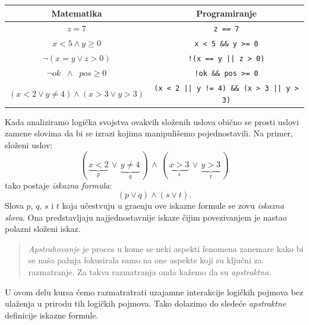 \begin{center}
    \begin{tabular}{@{}cc@{}}
    \hline
    Matematika & Programiranje \\
    \hline
    $z = 7$ & \verb"z == 7" \\
    $x < 5 \land y \ge 0$ & \verb"x < 5 && y >= 0" \\
    $\lnot(x = y \lor z > 0)$ & \verb"!(x == y || z > 0)" \\
    $\lnot\mathit{ok} \;\;\land\;\; \mathit{pos} \ge 0$ & \verb"!ok && pos >= 0" \\
    $(x < 2 \lor y \ne 4) \land (x > 3 \lor y > 3)$ &
    {\verb"(x < 2 || y != 4) && (x > 3 || y > 3)"}
    \end{tabular}
\end{center}

Kada analiziramo logi\v cka svojstva ovakvih slo\v zenih uslova obi\v cno se
prosti uslovi zamene slovima da bi se izrazi kojima manipuli\v semo pojednostavili.
Na primer, slo\v zeni uslov:
$$
  ( \, \underbrace{x < 2}_p \,\lor\, \underbrace{y \ne 4}_q \, ) \,\land\, (\, \underbrace{x > 3}_s \,\lor\, \underbrace{y > 3}_t \, )
$$
tako postaje \emph{iskazna formula}:
$$
  (p \lor q) \land (s \lor t).
$$
Slova $p$, $q$, $s$ i $t$ koja u\v cestvuju u gra\dj enju ove iskazne formule se zovu \emph{iskazna slova}.
Ona predstavljaju najjednostavnije iskaze \v cijim povezivanjem je nastao polazni slo\v zeni iskaz.

\begin{quote}
  \emph{Apstrahovanje} je proces u kome se neki aspekti fenomena zanemare kako bi se na\v sa pa\v znja fokusirala samo na one
  aspekte koji su klju\v cni za razmatranje. Za takva razmatranja onda ka\v zemo da su \emph{apstraktna}.
\end{quote}

U ovom delu kursa \'cemo razmatratrati uzajamne interakcije logi\v ckih pojmova bez ula\v zenja u
prirodu tih logi\v ckih pojmova. Tako dolazimo do slede\'ce \emph{apstraktne} definicije iskazne formule.


